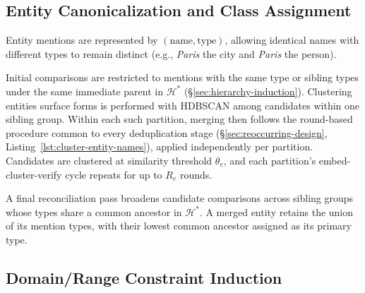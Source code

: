 \documentclass[11pt]{article}
\begin{document}
\subsection{Entity Canonicalization and Class Assignment}
\label{sec:entity-dedup}


Entity mentions are represented by $(\text{name},\text{type})$, allowing identical names with different types to remain distinct (e.g., \emph{Paris} the city and \emph{Paris} the person).

Initial comparisons are restricted to mentions with the same type or sibling types under the same immediate parent in $\mathcal{H}^*$ (\S\ref{sec:hierarchy-induction}).
Clustering entities surface forms is performed with HDBSCAN  among candidates within one sibling
group. Within each such partition, merging then follows the round-based procedure common to every deduplication stage (\S\ref{sec:reoccurring-design}, Listing~\ref{lst:cluster-entity-names}), applied independently per partition. Candidates are clustered at similarity threshold $\theta_e$, and each partition's embed-cluster-verify cycle repeats for up to $R_e$ rounds.

A final reconciliation pass broadens candidate comparisons across sibling groups whose types share a common ancestor in $\mathcal{H}^*$. A merged entity retains the union of its mention types, with their lowest common ancestor assigned as its primary type.

\subsection{Domain/Range Constraint Induction}
\label{sec:constraints}

\end{document}
